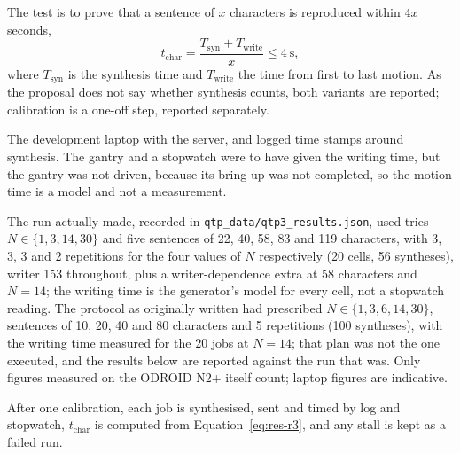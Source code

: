 
\medskip
\label{sec:res-qtp3}


            The test is to prove that a sentence of $x$ characters is reproduced within $4x$ seconds,
            \begin{equation}
            \label{eq:res-r3}
            t_{\mathrm{char}}=\frac{T_{\mathrm{syn}}+T_{\mathrm{write}}}{x}\le 4\ \mathrm{s},
            \end{equation}
            where $T_{\mathrm{syn}}$ is the synthesis time and $T_{\mathrm{write}}$ the time from first to last motion.
            As the proposal does not say whether synthesis counts, both variants are reported; calibration is a one-off step, reported separately.


            The development laptop with the server, and logged time stamps around synthesis. The gantry and a stopwatch were to have given the writing time, but the gantry was not driven, because its bring-up was not completed, so the motion time is a model and not a measurement.


            The run actually made, recorded in \texttt{qtp\_data/qtp3\_results.json}, used tries $N\in\{1,3,14,30\}$ and five sentences of 22, 40, 58, 83 and 119 characters, with 3, 3, 3 and 2 repetitions for the four values of $N$ respectively (20 cells, 56 syntheses), writer 153 throughout, plus a writer-dependence extra at 58 characters and $N=14$; the writing time is the generator's model for every cell, not a stopwatch reading.
            The protocol as originally written had prescribed $N\in\{1,3,6,14,30\}$, sentences of 10, 20, 40 and 80 characters and 5 repetitions (100 syntheses), with the writing time measured for the 20 jobs at $N=14$; that plan was not the one executed, and the results below are reported against the run that was.
            Only figures measured on the ODROID N2+ itself count; laptop figures are indicative.


            After one calibration, each job is synthesised, sent and timed by log and stopwatch, $t_{\mathrm{char}}$ is computed from Equation~\ref{eq:res-r3}, and any stall is kept as a failed run.

